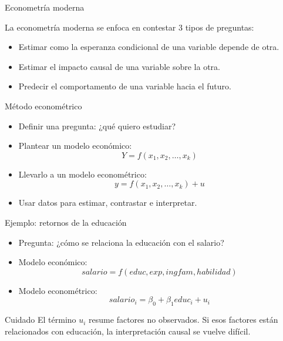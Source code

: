 \documentclass{beamer}
\begin{document}
\begin{frame}{Econometría moderna}


  La econometr\'ia moderna se enfoca en contestar 3 tipos de preguntas:
  \begin{itemize}
      \item Estimar como la esperanza condicional de una variable depende de otra.
      \item Estimar el impacto causal de una variable sobre la otra.
      \item Predecir el comportamento de una variable hacia el futuro.
  \end{itemize}

\end{frame}

\begin{frame}{M\'etodo econom\'etrico}
    
\begin{itemize}
    \item Definir una pregunta: ¿qué quiero estudiar?
    \item Plantear un modelo económico:
    \[
        Y = f(x_1,x_2,\ldots,x_k)
    \]
    \item Llevarlo a un modelo econométrico:
    \[
        y = f(x_1,x_2,\ldots,x_k) + u
    \]
    \item Usar datos para estimar, contrastar e interpretar.
\end{itemize}

\end{frame}

\begin{frame}{Ejemplo: retornos de la educación}
\begin{itemize}
    \item Pregunta: ¿cómo se relaciona la educación con el salario?
    \item Modelo económico:
    \[
        salario = f(educ, exp, ingfam, habilidad)
    \]
    \item Modelo econométrico:
    \[
        salario_i = \beta_0 + \beta_1 educ_i + u_i
    \]
\end{itemize}

\begin{block}{Cuidado}
El término $u_i$ resume factores no observados. Si esos factores están relacionados con educación, la interpretación causal se vuelve difícil.
\end{block}
\end{frame}
\end{document}

